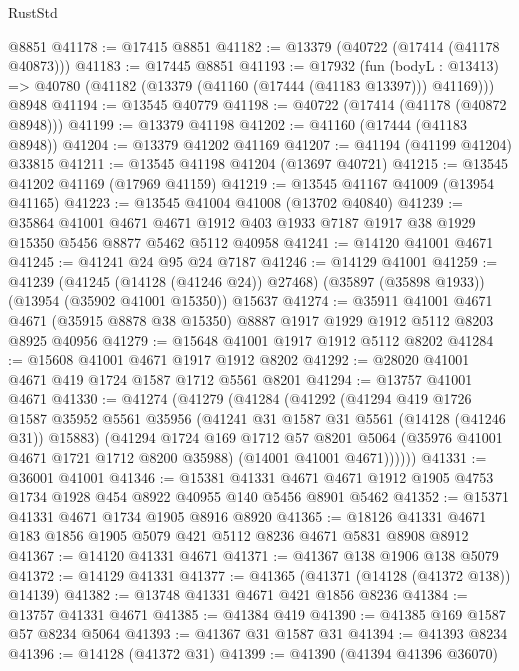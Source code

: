 \begin{lexlean}{RustStd}
\begin{coremodule}
    @8851
@41178 := @17415 @8851
@41182 := @13379 (@40722 (@17414 (@41178 @40873)))
@41183 := @17445 @8851
@41193 := @17932
    (fun (bodyL : @13413) => @40780 (@41182 (@13379 (@41160 (@17444 (@41183 @13397))) @41169)))
    @8948
@41194 := @13545 @40779
@41198 := @40722 (@17414 (@41178 (@40872 @8948)))
@41199 := @13379 @41198
@41202 := @41160 (@17444 (@41183 @8948))
@41204 := @13379 @41202 @41169
@41207 := @41194 (@41199 @41204) @33815
@41211 := @13545 @41198 @41204 (@13697 @40721)
@41215 := @13545 @41202 @41169 (@17969 @41159)
@41219 := @13545 @41167 @41009 (@13954 @41165)
@41223 := @13545 @41004 @41008 (@13702 @40840)
@41239 := @35864
    @41001
    @4671
    @4671
    @1912
    @403
    @1933
    @7187
    @1917
    @38
    @1929
    @15350
    @5456
    @8877
    @5462
    @5112
    @40958
@41241 := @14120 @41001 @4671
@41245 := @41241 @24 @95 @24 @7187
@41246 := @14129 @41001
@41259 := @41239
    (@41245 (@14128 (@41246 @24)) @27468)
    (@35897 (@35898 @1933))
    (@13954 (@35902 @41001 @15350))
    @15637
@41274 := @35911
    @41001
    @4671
    @4671
    (@35915 @8878 @38 @15350)
    @8887
    @1917
    @1929
    @1912
    @5112
    @8203
    @8925
    @40956
@41279 := @15648 @41001 @1917 @1912 @5112 @8202
@41284 := @15608 @41001 @4671 @1917 @1912 @8202
@41292 := @28020 @41001 @4671 @419 @1724 @1587 @1712 @5561 @8201
@41294 := @13757 @41001 @4671
@41330 := @41274
    (@41279
      (@41284
        (@41292
          (@41294
            @419
            @1726
            @1587
            @35952
            @5561
            @35956
            (@41241 @31 @1587 @31 @5561 (@14128 (@41246 @31)) @15883)
            (@41294
              @1724
              @169
              @1712
              @57
              @8201
              @5064
              (@35976 @41001 @4671 @1721 @1712 @8200 @35988)
              (@14001 @41001 @4671))))))
@41331 := @36001 @41001
@41346 := @15381
    @41331
    @4671
    @4671
    @1912
    @1905
    @4753
    @1734
    @1928
    @454
    @8922
    @40955
    @140
    @5456
    @8901
    @5462
@41352 := @15371 @41331 @4671 @1734 @1905 @8916 @8920
@41365 := @18126 @41331 @4671 @183 @1856 @1905 @5079 @421 @5112 @8236 @4671 @5831 @8908 @8912
@41367 := @14120 @41331 @4671
@41371 := @41367 @138 @1906 @138 @5079
@41372 := @14129 @41331
@41377 := @41365 (@41371 (@14128 (@41372 @138)) @14139)
@41382 := @13748 @41331 @4671 @421 @1856 @8236
@41384 := @13757 @41331 @4671
@41385 := @41384 @419
@41390 := @41385 @169 @1587 @57 @8234 @5064
@41393 := @41367 @31 @1587 @31
@41394 := @41393 @8234
@41396 := @14128 (@41372 @31)
@41399 := @41390 (@41394 @41396 @36070)

\end{coremodule}
\end{lexlean}
